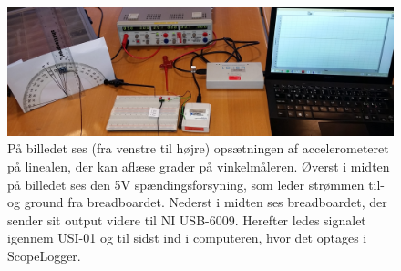 \begin{figure}[H]
	\centering
	\includegraphics[scale=0.14]{figures/cProblemloesning/Pilotforsoeg1.jpg}
	\caption{På billedet ses (fra venstre til højre) opsætningen af accelerometeret på linealen, der kan aflæse grader på vinkelmåleren. Øverst i midten på billedet ses den 5V spændingsforsyning, som leder strømmen til- og ground fra breadboardet. Nederst i midten ses breadboardet, der sender sit output videre til NI USB-6009. Herefter ledes signalet igennem USI-01 og til sidst ind i computeren, hvor det optages i ScopeLogger.}
	\label{pforsoeg2}
\end{figure}
